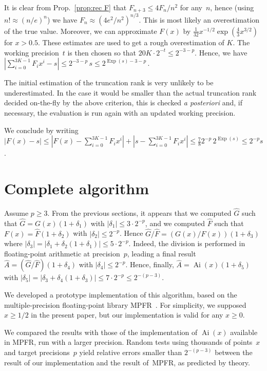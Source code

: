 \documentclass[10pt, conference]{IEEEtran}
\DeclareMathOperator{\Ai}{Ai}
\DeclareMathOperator{\EXP}{Exp}
\newcommand{\ttarget}{p}
\newcommand{\twork}{t}
\begin{document}
It is clear from Prop.~\ref{prop:rec F} that $F_{n+3} \le 4F_n/n^2$ for
any~$n$, hence (using $n! \approx (n/e)^n$) we have $F_n \approx
(4e^2/n^2)^{n/3}$. This is most likely an overestimation of the true value.
Moreover, we can approximate $F(x)$ by $\frac1{32} x^{-1/2} \exp(\frac{4}{3}
x^{3/2})$ for $x>0.5$. These estimates are used to get a rough overestimation of $K$. The working precision~$\twork$ is then chosen so that $20K\cdot2^{-\twork} \le 2^{-3-\ttarget}$. Hence, we have $|\sum_{i=0}^{3K-1} F_i x^i - s| \le 2^{-3-\ttarget}\,s \le 2^{\EXP(s)-3-\ttarget}\,$.

The initial estimation of the truncation rank is very unlikely to be
underestimated. In the case it would be smaller than the actual truncation rank
decided on-the-fly by the above criterion, this is checked \emph{a posteriori} and, if necessary, the evaluation is run again with an updated working precision.

We conclude by writing $|F(x)-s| \le |F(x)-\sum_{i=0}^{3K-1} F_i x^i| +
|s-\sum_{i=0}^{3K-1} F_i x^i| \le \frac{7}{8} 2^{-\ttarget}\,2^{\EXP(s)} \le 2^{-\ttarget} s$.

\section{Complete algorithm}
\label{sec:implementation}
Assume $\ttarget \ge 3$. From the previous sections, it appears that we computed $\widehat{G}$ such that $\widehat{G} = G(x)(1+\delta_1)$ with $|\delta_1| \le 3\cdot 2^{-\ttarget}$, and we computed $\widehat{F}$ such that $F(x) = \widehat{F}(1+\delta_2)$ with $|\delta_2| \le 2^{-\ttarget}$. Hence $\widehat{G}/\widehat{F} = (G(x)/F(x))(1+\delta_3)$ where $|\delta_3| = |\delta_1 + \delta_2(1+\delta_1)| \le 5 \cdot 2^{-\ttarget}$. Indeed, the division is performed in floating-point arithmetic at precision~$\ttarget$, leading a final result $\widehat{A} = (\widehat{G}/\widehat{F})(1+\delta_4)$ with $|\delta_4| \le 2^{-\ttarget}$. Hence, finally, $\widehat{A} = \Ai(x)(1+\delta_5)$ with $|\delta_5| = |\delta_3 + \delta_4(1+\delta_3)| \le 7\cdot 2^{-\ttarget} \le 2^{-(\ttarget - 3)}.$

We developed a prototype implementation of this algorithm, based on the multiple-precision floating-point library MPFR~\cite{FousseHanrotLefevrePelissierZimmermann2007}.
For simplicity, we supposed $x \geq 1/2$ in the present paper, but our implementation is valid for any $x \geq 0$.

We compared the results with those of the implementation of $\Ai(x)$ available in MPFR, run with a larger precision.
Random tests using thousands of points~$x$ and target precisions~$\ttarget$ yield relative errors smaller than $2^{-(\ttarget - 3)}$ between the result of our implementation and the result of~MPFR, as predicted by theory.
\end{document}
